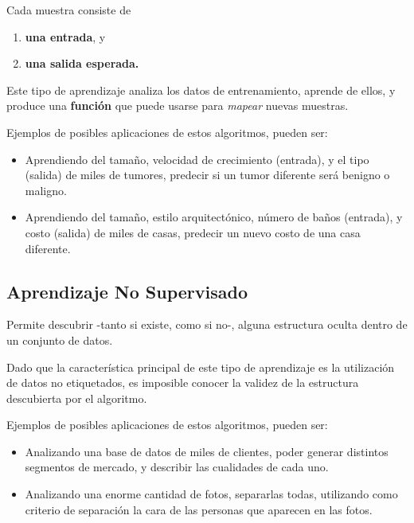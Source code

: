 \documentclass[twoside,twocolumn]{article}
\begin{document}
        Cada muestra consiste de

        \begin{enumerate}[label=(\alph*)]
          \item \textbf{una entrada}, y
          \item \textbf{una salida esperada.}
        \end{enumerate}
        
        Este tipo de aprendizaje analiza los datos de entrenamiento,
        aprende de ellos, y produce una \textbf{función} que puede usarse
        para \textit{mapear} nuevas muestras.

        Ejemplos de posibles aplicaciones de estos algoritmos, pueden ser:

        \begin{itemize}
          \item Aprendiendo del tamaño, velocidad de crecimiento (entrada),
                y el tipo (salida) de miles de tumores, predecir si un
                tumor diferente será benigno o maligno.
          \item Aprendiendo del tamaño, estilo arquitectónico, 
                número de baños (entrada), y costo (salida)
                de miles de casas, predecir un nuevo costo de una casa diferente.
        \end{itemize}

      \subsection{Aprendizaje No Supervisado}
        Permite descubrir -tanto si existe, como si no-, alguna estructura
        oculta dentro de un conjunto de datos.

        Dado que la característica principal de este tipo de aprendizaje
        es la utilización de datos no etiquetados, es imposible conocer
        la validez de la estructura descubierta por el algoritmo.

        Ejemplos de posibles aplicaciones de estos algoritmos, pueden ser:
        
        \begin{itemize}
          \item Analizando una base de datos de miles de clientes,
                poder generar distintos segmentos de mercado,
                y describir las cualidades de cada uno.
          \item Analizando una enorme cantidad de fotos, separarlas
                todas, utilizando como criterio de separación la cara
                de las personas que aparecen en las fotos.
        \end{itemize}
\end{document}
